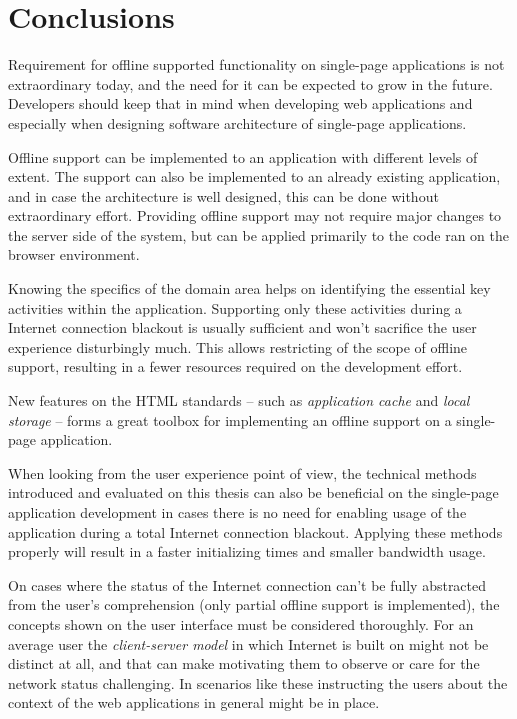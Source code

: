 
\chapter{Conclusions}

Requirement for offline supported functionality on single-page applications is not extraordinary today, and the need for it can be expected to grow in the future. Developers should keep that in mind when developing web applications and especially when designing software architecture of single-page applications.

Offline support can be implemented to an application with different levels of extent. The support can also be implemented to an already existing application, and in case the architecture is well designed, this can be done without extraordinary effort. Providing offline support may not require major changes to the server side of the system, but can be applied primarily to the code ran on the browser environment.

Knowing the specifics of the domain area helps on identifying the essential key activities within the application. Supporting only these activities during a Internet connection blackout is usually sufficient and won't sacrifice the user experience disturbingly much. This allows restricting of the scope of offline support, resulting in a fewer resources required on the development effort.

New features on the HTML standards – such as \textit{application cache} and \textit{local storage} – forms a great toolbox for implementing an offline support on a single-page application.

When looking from the user experience point of view, the technical methods introduced and evaluated on this thesis can also be beneficial on the single-page application development in cases there is no need for enabling usage of the application during a total Internet connection blackout. Applying these methods properly will result in a faster initializing times and smaller bandwidth usage.

On cases where the status of the Internet connection can't be fully abstracted from the user's comprehension (only partial offline support is implemented), the concepts shown on the user interface must be considered thoroughly. For an average user the \textit{client-server model} in which Internet is built on might not be distinct at all, and that can make motivating them to observe or care for the network status challenging. In scenarios like these instructing the users about the context of the web applications in general might be in place.

